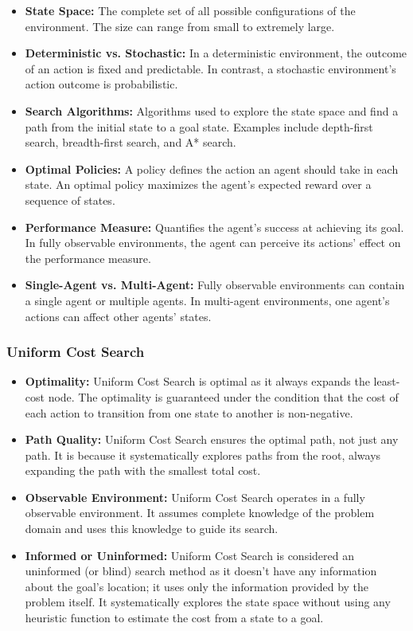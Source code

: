 \documentclass[a4paper,UKenglish,cleveref, autoref, thm-restate]{qlinhta}
\begin{document}
    \begin{itemize}
        \item \textbf{State Space:} The complete set of all possible configurations of the environment. The size can range from small to extremely large.

        \item \textbf{Deterministic vs. Stochastic:} In a deterministic environment, the outcome of an action is fixed and predictable. In contrast, a stochastic environment's action outcome is probabilistic.

        \item \textbf{Search Algorithms:} Algorithms used to explore the state space and find a path from the initial state to a goal state. Examples include depth-first search, breadth-first search, and A* search.

        \item \textbf{Optimal Policies:} A policy defines the action an agent should take in each state. An optimal policy maximizes the agent's expected reward over a sequence of states.

        \item \textbf{Performance Measure:} Quantifies the agent's success at achieving its goal. In fully observable environments, the agent can perceive its actions' effect on the performance measure.

        \item \textbf{Single-Agent vs. Multi-Agent:} Fully observable environments can contain a single agent or multiple agents. In multi-agent environments, one agent's actions can affect other agents' states.
    \end{itemize}

    \subsubsection{Uniform Cost Search}

    \begin{itemize}
        \item \textbf{Optimality:} Uniform Cost Search is optimal as it always expands the least-cost node. The optimality is guaranteed under the condition that the cost of each action to transition from one state to another is non-negative.
        \item \textbf{Path Quality:} Uniform Cost Search ensures the optimal path, not just any path. It is because it systematically explores paths from the root, always expanding the path with the smallest total cost.
        \item \textbf{Observable Environment:} Uniform Cost Search operates in a fully observable environment. It assumes complete knowledge of the problem domain and uses this knowledge to guide its search.
        \item \textbf{Informed or Uninformed:} Uniform Cost Search is considered an uninformed (or blind) search method as it doesn't have any information about the goal's location; it uses only the information provided by the problem itself. It systematically explores the state space without using any heuristic function to estimate the cost from a state to a goal.
    \end{itemize}
\end{document}
